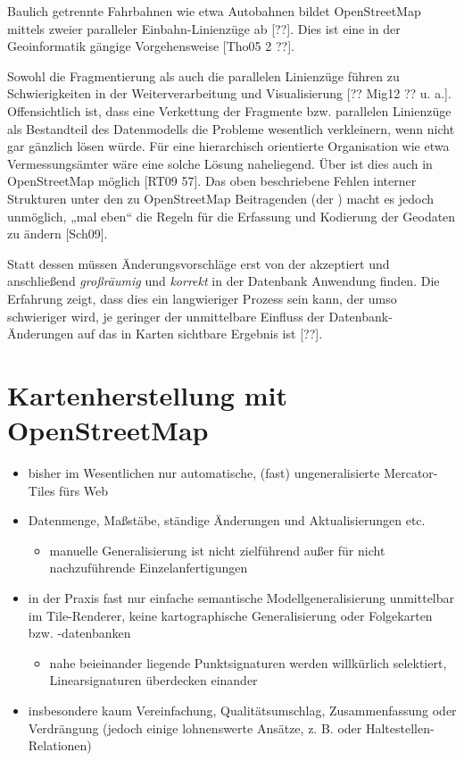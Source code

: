 \documentclass{../thesis}
\begin{document}
Baulich getrennte Fahrbahnen wie etwa Autobahnen bildet OpenStreetMap mittels zweier paralleler Einbahn-Linienzüge ab [??]. Dies ist eine in der Geoinformatik gängige Vorgehensweise [Tho05 2 ??].

Sowohl die Fragmentierung als auch die parallelen Linienzüge führen zu Schwierigkeiten in der Weiterverarbeitung und Visualisierung [?? Mig12 ?? u. a.].
Offensichtlich ist, dass eine Verkettung der Fragmente bzw. parallelen Linienzüge als Bestandteil des Datenmodells die Probleme wesentlich verkleinern, wenn nicht gar gänzlich lösen würde. Für eine hierarchisch orientierte Organisation wie etwa Vermessungsämter wäre eine solche Lösung naheliegend. Über  ist dies auch in OpenStreetMap möglich [RT09 57]. Das oben beschriebene Fehlen interner Strukturen unter den zu OpenStreetMap Beitragenden (der ) macht es jedoch unmöglich, „mal eben“ die Regeln für die Erfassung und Kodierung der Geodaten zu ändern [Sch09].

Statt dessen müssen Änderungsvorschläge erst von der  akzeptiert und anschließend \emph{großräumig} und \emph{korrekt} in der Datenbank Anwendung finden. Die Erfahrung zeigt, dass dies ein langwieriger Prozess sein kann, der umso schwieriger wird, je geringer der unmittelbare Einfluss der Datenbank-Änderungen auf das in Karten sichtbare Ergebnis ist [??].





\section{Kartenherstellung mit OpenStreetMap}

\begin{itemize}
	\item bisher im Wesentlichen nur automatische, (fast) ungeneralisierte Mercator-Tiles fürs Web
	\item Datenmenge, Maßstäbe, ständige Änderungen und Aktualisierungen etc.
	\begin{itemize}
		\item manuelle Generalisierung ist nicht zielführend außer für nicht nachzuführende Einzelanfertigungen
	\end{itemize}
	\item in der Praxis fast nur einfache semantische Modellgeneralisierung unmittelbar im Tile-Renderer, keine kartographische Generalisierung oder Folgekarten bzw. -datenbanken
	\begin{itemize}
		\item nahe beieinander liegende Punktsignaturen werden willkürlich selektiert, Linearsignaturen überdecken einander
	\end{itemize}
	\item insbesondere kaum Vereinfachung, Qualitätsumschlag, Zusammenfassung oder Verdrängung (jedoch einige lohnenswerte Ansätze, z. B. \cite{MWG12} oder Haltestellen-Relationen)
\end{itemize}
\end{document}
